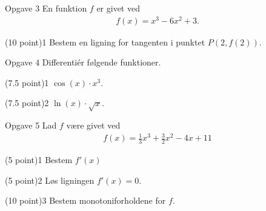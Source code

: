 
\newpage
\begin{opgavetekst}{Opgave 3}
	En funktion $f$ er givet ved
	\begin{align*}
		f(x) = x^3-6x^2+3.
	\end{align*}
\end{opgavetekst}
\begin{delopgave}{(10 point)}{1}
	Bestem en ligning for tangenten i punktet $P(2,f(2))$. 
\end{delopgave}
\begin{opgavetekst}{Opgave 4}
	Differentiér følgende funktioner. 
\end{opgavetekst}
\begin{delopgave}{(7.5 point)}{1}
	$\cos(x)\cdot x^3$.
\end{delopgave}
\begin{delopgave}{(7.5 point)}{2}
	$\ln(x)\cdot \sqrt{x}$.
\end{delopgave}

\begin{opgavetekst}{Opgave 5}
	Lad $f$ være givet ved
	\begin{align*}
		f(x) = \frac{1}{3}x^3 +\frac{3}{2}x^2-4x+11
	\end{align*}
\end{opgavetekst}
\begin{delopgave}{(5 point)}{1}
	Bestem $f'(x)$
\end{delopgave}
\begin{delopgave}{(5 point)}{2}
	Løs ligningen $f'(x)=0$. 
\end{delopgave}
\begin{delopgave}{(10 point)}{3}
	Bestem monotoniforholdene for $f$. 
\end{delopgave}
